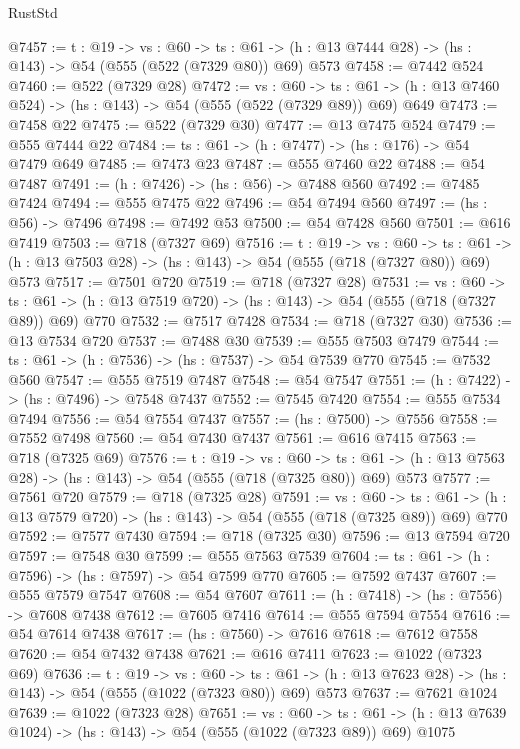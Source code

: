 \begin{lexlean}{RustStd}
\begin{coremodule}
@7457 := {t : @19} ->
  {vs : @60} ->
  {ts : @61} -> (h : @13 @7444 @28) -> (hs : @143) -> @54 (@555 (@522 (@7329 @80)) @69) @573
@7458 := @7442 @524
@7460 := @522 (@7329 @28)
@7472 := {vs : @60} ->
  {ts : @61} -> (h : @13 @7460 @524) -> (hs : @143) -> @54 (@555 (@522 (@7329 @89)) @69) @649
@7473 := @7458 @22
@7475 := @522 (@7329 @30)
@7477 := @13 @7475 @524
@7479 := @555 @7444 @22
@7484 := {ts : @61} -> (h : @7477) -> (hs : @176) -> @54 @7479 @649
@7485 := @7473 @23
@7487 := @555 @7460 @22
@7488 := @54 @7487
@7491 := (h : @7426) -> (hs : @56) -> @7488 @560
@7492 := @7485 @7424
@7494 := @555 @7475 @22
@7496 := @54 @7494 @560
@7497 := (hs : @56) -> @7496
@7498 := @7492 @53
@7500 := @54 @7428 @560
@7501 := @616 @7419
@7503 := @718 (@7327 @69)
@7516 := {t : @19} ->
  {vs : @60} ->
  {ts : @61} -> (h : @13 @7503 @28) -> (hs : @143) -> @54 (@555 (@718 (@7327 @80)) @69) @573
@7517 := @7501 @720
@7519 := @718 (@7327 @28)
@7531 := {vs : @60} ->
  {ts : @61} -> (h : @13 @7519 @720) -> (hs : @143) -> @54 (@555 (@718 (@7327 @89)) @69) @770
@7532 := @7517 @7428
@7534 := @718 (@7327 @30)
@7536 := @13 @7534 @720
@7537 := @7488 @30
@7539 := @555 @7503 @7479
@7544 := {ts : @61} -> (h : @7536) -> (hs : @7537) -> @54 @7539 @770
@7545 := @7532 @560
@7547 := @555 @7519 @7487
@7548 := @54 @7547
@7551 := (h : @7422) -> (hs : @7496) -> @7548 @7437
@7552 := @7545 @7420
@7554 := @555 @7534 @7494
@7556 := @54 @7554 @7437
@7557 := (hs : @7500) -> @7556
@7558 := @7552 @7498
@7560 := @54 @7430 @7437
@7561 := @616 @7415
@7563 := @718 (@7325 @69)
@7576 := {t : @19} ->
  {vs : @60} ->
  {ts : @61} -> (h : @13 @7563 @28) -> (hs : @143) -> @54 (@555 (@718 (@7325 @80)) @69) @573
@7577 := @7561 @720
@7579 := @718 (@7325 @28)
@7591 := {vs : @60} ->
  {ts : @61} -> (h : @13 @7579 @720) -> (hs : @143) -> @54 (@555 (@718 (@7325 @89)) @69) @770
@7592 := @7577 @7430
@7594 := @718 (@7325 @30)
@7596 := @13 @7594 @720
@7597 := @7548 @30
@7599 := @555 @7563 @7539
@7604 := {ts : @61} -> (h : @7596) -> (hs : @7597) -> @54 @7599 @770
@7605 := @7592 @7437
@7607 := @555 @7579 @7547
@7608 := @54 @7607
@7611 := (h : @7418) -> (hs : @7556) -> @7608 @7438
@7612 := @7605 @7416
@7614 := @555 @7594 @7554
@7616 := @54 @7614 @7438
@7617 := (hs : @7560) -> @7616
@7618 := @7612 @7558
@7620 := @54 @7432 @7438
@7621 := @616 @7411
@7623 := @1022 (@7323 @69)
@7636 := {t : @19} ->
  {vs : @60} ->
  {ts : @61} -> (h : @13 @7623 @28) -> (hs : @143) -> @54 (@555 (@1022 (@7323 @80)) @69) @573
@7637 := @7621 @1024
@7639 := @1022 (@7323 @28)
@7651 := {vs : @60} ->
  {ts : @61} -> (h : @13 @7639 @1024) -> (hs : @143) -> @54 (@555 (@1022 (@7323 @89)) @69) @1075

\end{coremodule}
\end{lexlean}

